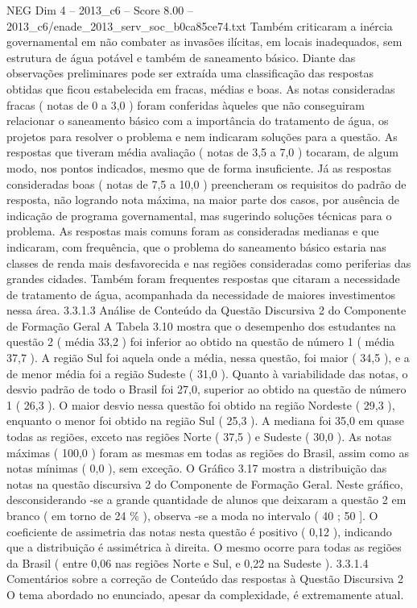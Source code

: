 \begin{textsample}{NEG Dim 4 – 2013\_c6 – Score 8.00 – 2013\_c6/enade\_2013\_serv\_soc\_b0ca85ce74.txt}
Também criticaram a inércia governamental em não combater as invasões ilícitas, em locais inadequados, sem estrutura de água potável e também de saneamento básico.
Diante das observações preliminares pode ser extraída uma classificação das respostas obtidas que ficou estabelecida em fracas, médias e boas.
As notas consideradas fracas ( notas de 0 a 3,0 ) foram conferidas àqueles que não conseguiram relacionar o saneamento básico com a importância do tratamento de água, os projetos para resolver o problema e nem indicaram soluções para a questão.
As respostas que tiveram média avaliação ( notas de 3,5 a 7,0 ) tocaram, de algum modo, nos pontos indicados, mesmo que de forma insuficiente.
Já as respostas consideradas boas ( notas de 7,5 a 10,0 ) preencheram os requisitos do padrão de resposta, não logrando nota máxima, na maior parte dos casos, por ausência de indicação de programa governamental, mas sugerindo soluções técnicas para o problema.
As respostas mais comuns foram as consideradas medianas e que indicaram, com frequência, que o problema do saneamento básico estaria nas classes de renda mais desfavorecida e nas regiões consideradas como periferias das grandes cidades.
Também foram frequentes respostas que citaram a necessidade de tratamento de água, acompanhada da necessidade de maiores investimentos nessa área. 3.3.1.3 Análise de Conteúdo da Questão Discursiva 2 do Componente de Formação Geral A Tabela 3.10 mostra que o desempenho dos estudantes na questão 2 ( média 33,2 ) foi inferior ao obtido na questão de número 1 ( média 37,7 ).
A região Sul foi aquela onde a média, nessa questão, foi maior ( 34,5 ), e a de menor média foi a região Sudeste ( 31,0 ).
Quanto à variabilidade das notas, o desvio padrão de todo o Brasil foi 27,0, superior ao obtido na questão de número 1 ( 26,3 ).
O maior desvio nessa questão foi obtido na região Nordeste ( 29,3 ), enquanto o menor foi obtido na região Sul ( 25,3 ).
A mediana foi 35,0 em quase todas as regiões, exceto nas regiões Norte ( 37,5 ) e Sudeste ( 30,0 ).
As notas máximas ( 100,0 ) foram as mesmas em todas as regiões do Brasil, assim como as notas mínimas ( 0,0 ), sem exceção.
O Gráfico 3.17 mostra a distribuição das notas na questão discursiva 2 do Componente de Formação Geral.
Neste gráfico, desconsiderando -se a grande quantidade de alunos que deixaram a questão 2 em branco ( em torno de 24 \% ), observa -se a moda no intervalo ( 40 ; 50 ].
O coeficiente de assimetria das notas nesta questão é positivo ( 0,12 ), indicando que a distribuição é assimétrica à direita.
O mesmo ocorre para todas as regiões da Brasil ( entre 0,06 nas regiões Norte e Sul, e 0,22 na Sudeste ). 3.3.1.4 Comentários sobre a correção de Conteúdo das respostas à Questão Discursiva 2 O tema abordado no enunciado, apesar da complexidade, é extremamente atual.

\end{textsample}
